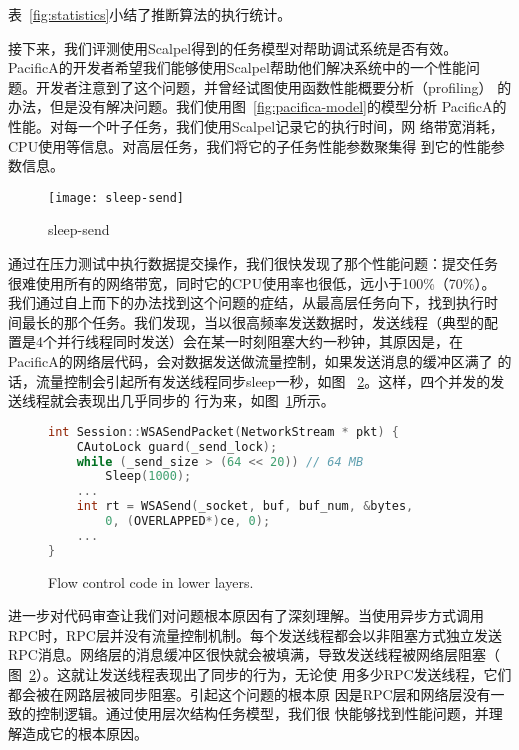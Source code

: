 表~\ref{fig:statistics}小结了推断算法的执行统计。

接下来，我们评测使用Scalpel得到的任务模型对帮助调试系统是否有效。
PacificA的开发者希望我们能够使用Scalpel帮助他们解决系统中的一个性能问
题。开发者注意到了这个问题，并曾经试图使用函数性能概要分析（profiling）
的办法，但是没有解决问题。我们使用图~\ref{fig:pacifica-model}的模型分析
PacificA的性能。对每一个叶子任务，我们使用Scalpel记录它的执行时间，网
络带宽消耗，CPU使用等信息。对高层任务，我们将它的子任务性能参数聚集得
到它的性能参数信息。

\begin{figure}
  \centering
  \begin{minipage}{0.8\linewidth}
    \centering
    \texttt{[image: sleep-send]}
    \caption{sleep-send}
    \label{fig:sleep-send}
  \end{minipage}
\end{figure}


通过在压力测试中执行数据提交操作，我们很快发现了那个性能问题：提交任务
很难使用所有的网络带宽，同时它的CPU使用率也很低，远小于100\%（70\%）。
我们通过自上而下的办法找到这个问题的症结，从最高层任务向下，找到执行时
间最长的那个任务。我们发现，当以很高频率发送数据时，发送线程（典型的配
置是4个并行线程同时发送）会在某一时刻阻塞大约一秒钟，其原因是，在
PacificA的网络层代码，会对数据发送做流量控制，如果发送消息的缓冲区满了
的话，流量控制会引起所有发送线程同步sleep一秒，如图~
\ref{fig:flow_control_code}。这样，四个并发的发送线程就会表现出几乎同步的
行为来，如图~\ref{fig:sleep-send}所示。

\begin{figure}
\centering
\begin{lstlisting}[language=C++]
int Session::WSASendPacket(NetworkStream * pkt) {    
    CAutoLock guard(_send_lock);
    while (_send_size > (64 << 20)) // 64 MB
        Sleep(1000);
    ...
    int rt = WSASend(_socket, buf, buf_num, &bytes,
        0, (OVERLAPPED*)ce, 0);
    ...
}
\end{lstlisting}
\caption{Flow control code in lower layers.}
\label{fig:flow_control_code}
\end{figure}


进一步对代码审查让我们对问题根本原因有了深刻理解。当使用异步方式调用
RPC时，RPC层并没有流量控制机制。每个发送线程都会以非阻塞方式独立发送
RPC消息。网络层的消息缓冲区很快就会被填满，导致发送线程被网络层阻塞（
图~\ref{fig:flow_control_code}）。这就让发送线程表现出了同步的行为，无论使
用多少RPC发送线程，它们都会被在网路层被同步阻塞。引起这个问题的根本原
因是RPC层和网络层没有一致的控制逻辑。通过使用层次结构任务模型，我们很
快能够找到性能问题，并理解造成它的根本原因。

